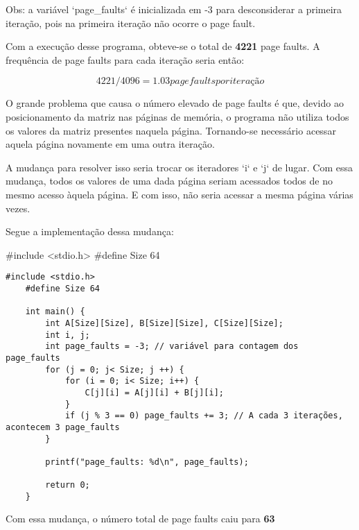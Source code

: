 Obs: a variável `page_faults` é inicializada em -3 para
 desconsiderar a primeira iteração, pois na primeira iteração
 não ocorre o page fault. 

Com a execução desse programa, obteve-se o total de \textbf{4221}
 page faults. A frequência de page faults para cada iteração seria então:

 \[4221/4096 = 1.03 page faults por iteração\]




O grande problema que causa o número elevado de page faults é que,
 devido ao posicionamento da matriz nas páginas de memória, o
 programa não utiliza todos os valores da matriz presentes naquela
 página. Tornando-se necessário acessar aquela página novamente
 em uma outra iteração.

A mudança para resolver isso seria trocar os iteradores `i` e `j` de lugar.
 Com essa mudança, todos os valores de uma dada página seriam acessados todos de
 no mesmo acesso àquela página. E com isso, não seria acessar a mesma
 página várias vezes.

Segue a implementação dessa mudança:

#include <stdio.h>
#define Size 64

\begin{lstlisting}[style=CStyle]
    #include <stdio.h>
    #define Size 64
    
    int main() {
        int A[Size][Size], B[Size][Size], C[Size][Size];
        int i, j;
        int page_faults = -3; // variável para contagem dos page_faults
        for (j = 0; j< Size; j ++) {
            for (i = 0; i< Size; i++) {
                C[j][i] = A[j][i] + B[j][i];
            }
            if (j % 3 == 0) page_faults += 3; // A cada 3 iterações, acontecem 3 page_faults
        }
    
        printf("page_faults: %d\n", page_faults);
    
        return 0;
    }
\end{lstlisting}

Com essa mudança, o número total de page
 faults caiu para \textbf{63}